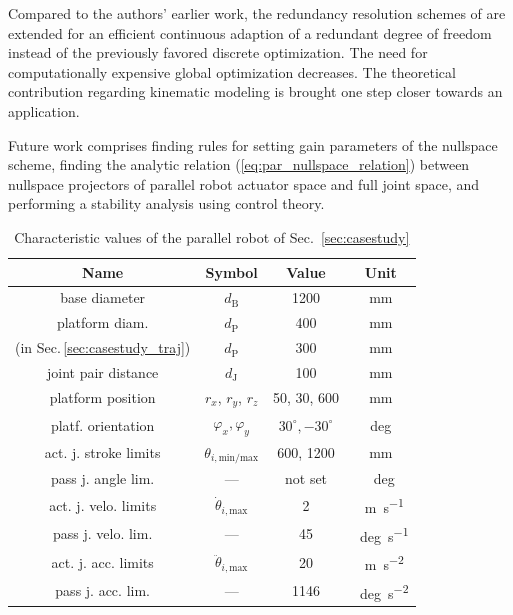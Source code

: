 \documentclass[a4paper,twoside]{article}
\begin{document}
Compared to the authors' earlier work, the redundancy resolution schemes of \cite{KotlarskiDoHeiOrt2010} are extended for an efficient continuous adaption of a redundant degree of freedom instead of the previously favored discrete optimization.
The need for computationally expensive global optimization decreases.
The theoretical contribution \cite{SchapplerTapOrt2019} regarding kinematic modeling is brought one step closer towards an application.

Future work comprises finding rules for setting gain parameters of the nullspace scheme, finding the analytic relation (\ref{eq:par_nullspace_relation}) between nullspace projectors of parallel robot actuator space and full joint space, and performing a stability analysis using control theory. %

\vspace{0.2cm} %

\begin{table}[hb] %
	\caption{Characteristic values of the parallel robot of Sec.~\ref{sec:casestudy}}
	\label{tab:hexapod_values}
	\centering
	\setlength\tabcolsep{3 pt}
	\begin{tabular}[t]{|c|c|c|c|}
		\hline
		\textbf{Name} & \textbf{Symbol} & \textbf{Value} & \textbf{Unit} \\
		\hline
		base diameter & $d_\mathrm{B}$ & 1200 &mm \\
		platform diam. & $d_\mathrm{P}$ & 400 & mm \\ %
		(in Sec.\,\ref{sec:casestudy_traj}) & $d_\mathrm{P}$ & 300 & mm \\
		joint pair distance & $d_\mathrm{J}$ & 100 & mm \\
		platform position & $r_x$, $r_y$, $r_z$ & 50, 30, 600 & mm \\
		platf. orientation & $\varphi_x, \varphi_y$ & $30^\circ,{-}30^\circ$ & deg \\
		act. j. stroke limits & $\theta_{i,\mathrm{min/max}}$ & 600, 1200 & mm\\ %
		pass j. angle lim. & --- & not set & \SI{}{deg}\\
		act. j. velo. limits & $\dot{\theta}_{i,\mathrm{max}}$ & 2 & \SI{}{\metre\per\second} \\
		pass j. velo. lim. & --- & 45 & \SI{}{deg\per\second}\\
		act. j. acc. limits & $\ddot{\theta}_{i,\mathrm{max}}$ & 20 & \SI{}{\metre\per\square\second} \\
		pass j. acc. lim. & --- & 1146 & \SI{}{deg\per\square\second}\\
		\hline
	\end{tabular}
\end{table}
\end{document}
